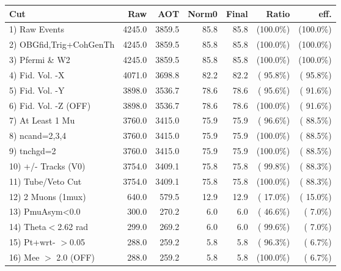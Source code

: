  \begin{table}[h!]\centering
 \begin{tabular}{||l||r|r|r|r|r|r||}
 \hline
 \hline
 Cut & Raw & AOT & Norm0 & Final & Ratio & eff.       \\
 \hline
  1) Raw Events           &       4245.0 &       3859.5 &         85.8 &         85.8 & (100.0\%) & (100.0\%) \\
  2) OBGfid,Trig+CohGenTh &       4245.0 &       3859.5 &         85.8 &         85.8 & (100.0\%) & (100.0\%) \\
  3) Pfermi \& W2         &       4245.0 &       3859.5 &         85.8 &         85.8 & (100.0\%) & (100.0\%) \\
  4) Fid. Vol. -X         &       4071.0 &       3698.8 &         82.2 &         82.2 & ( 95.8\%) & ( 95.8\%) \\
  5) Fid. Vol. -Y         &       3898.0 &       3536.7 &         78.6 &         78.6 & ( 95.6\%) & ( 91.6\%) \\
  6) Fid. Vol. -Z (OFF)   &       3898.0 &       3536.7 &         78.6 &         78.6 & (100.0\%) & ( 91.6\%) \\
  7) At Least 1 Mu        &       3760.0 &       3415.0 &         75.9 &         75.9 & ( 96.6\%) & ( 88.5\%) \\
  8) ncand=2,3,4          &       3760.0 &       3415.0 &         75.9 &         75.9 & (100.0\%) & ( 88.5\%) \\
  9) tnchgd=2             &       3760.0 &       3415.0 &         75.9 &         75.9 & (100.0\%) & ( 88.5\%) \\
 10) +/- Tracks (V0)      &       3754.0 &       3409.1 &         75.8 &         75.8 & ( 99.8\%) & ( 88.3\%) \\
 11) Tube/Veto Cut        &       3754.0 &       3409.1 &         75.8 &         75.8 & (100.0\%) & ( 88.3\%) \\
 12) 2 Muons (1mux)       &        640.0 &        579.5 &         12.9 &         12.9 & ( 17.0\%) & ( 15.0\%) \\
 13) PmuAsym<0.0          &        300.0 &        270.2 &          6.0 &          6.0 & ( 46.6\%) & (  7.0\%) \\
 14) Theta$<$2.62 rad     &        299.0 &        269.2 &          6.0 &          6.0 & ( 99.6\%) & (  7.0\%) \\
 15) Pt+wrt- $>$0.05      &        288.0 &        259.2 &          5.8 &          5.8 & ( 96.3\%) & (  6.7\%) \\
 16) Mee $>$ 2.0  (OFF)   &        288.0 &        259.2 &          5.8 &          5.8 & (100.0\%) & (  6.7\%) \\

\end{tabular}
\end{table}
